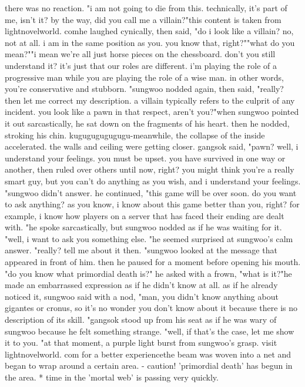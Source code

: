 there was no reaction.
"i am not going to die from this.
 technically, it's part of me, isn't it? by the way, did you call me a villain?"this content is taken from lightnov‌elworld.
comhe laughed cynically, then said, "do i look like a villain? no, not at all.
 i am in the same position as you.
 you know that, right?""what do you mean?""i mean we're all just horse pieces on the chessboard.
 don't you still understand it? it's just that our roles are different.
 i'm playing the role of a progressive man while you are playing the role of a wise man.
 in other words, you're conservative and stubborn.
"sungwoo nodded again, then said, "really? then let me correct my description.
 a villain typically refers to the culprit of any incident.
 you look like a pawn in that respect, aren't you?"when sungwoo pointed it out sarcastically, he sat down on the fragments of his heart.
 then he nodded, stroking his chin.
kugugugugugugu-meanwhile, the collapse of the inside accelerated.
 the walls and ceiling were getting closer.
gangsok said, "pawn? well, i understand your feelings.
 you must be upset.
 you have survived in one way or another, then ruled over others until now, right? you might think you're a really smart guy, but you can't do anything as you wish, and i understand your feelings.
"sungwoo didn't answer.
he continued, "this game will be over soon.
 do you want to ask anything? as you know, i know about this game better than you, right? for example, i know how players on a server that has faced their ending are dealt with.
"he spoke sarcastically, but sungwoo nodded as if he was waiting for it.
 "well, i want to ask you something else.
"he seemed surprised at sungwoo's calm answer.
"really? tell me about it then.
"sungwoo looked at the message that appeared in front of him.
 then he paused for a moment before opening his mouth.
"do you know what primordial death is?"
he asked with a frown, "what is it?"he made an embarrassed expression as if he didn't know at all.
 as if he already noticed it, sungwoo said with a nod, "man, you didn't know anything about gigantes or cronus, so it's no wonder you don't know about it because there is no description of its skill.
"gangsok stood up from his seat as if he was wary of sungwoo because he felt something strange.
 "well, if that's the case, let me show it to you.
"at that moment, a purple light burst from sungwoo's grasp.
visit lightnovelworld.
com for a better experiencethe beam was woven into a net and began to wrap around a certain area.
- caution! 'primordial death' has begun in the area.
* time in the 'mortal web' is passing very quickly.
